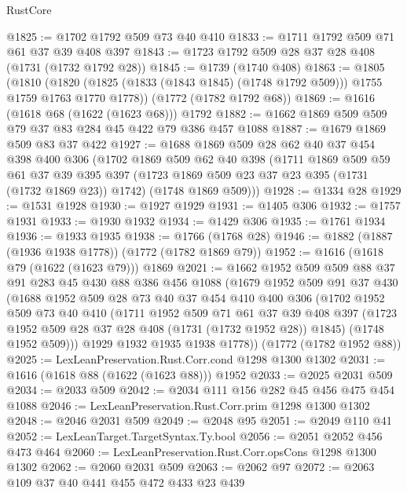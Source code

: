 \begin{lexlean}{RustCore}
\begin{coremodule}
@1825 := @1702 @1792 @509 @73 @40 @410
@1833 := @1711 @1792 @509 @71 @61 @37 @39 @408 @397
@1843 := @1723 @1792 @509 @28 @37 @28 @408 (@1731 (@1732 @1792 @28))
@1845 := @1739 (@1740 @408)
@1863 := @1805
    (@1810 (@1820 (@1825 (@1833 (@1843 @1845) (@1748 @1792 @509))) @1755 @1759 @1763 @1770 @1778))
    (@1772 (@1782 @1792 @68))
@1869 := @1616 (@1618 @68 (@1622 (@1623 @68))) @1792
@1882 := @1662 @1869 @509 @509 @79 @37 @83 @284 @45 @422 @79 @386 @457 @1088
@1887 := @1679 @1869 @509 @83 @37 @422
@1927 := @1688
    @1869
    @509
    @28
    @62
    @40
    @37
    @454
    @398
    @400
    @306
    (@1702
      @1869
      @509
      @62
      @40
      @398
      (@1711
        @1869
        @509
        @59
        @61
        @37
        @39
        @395
        @397
        (@1723 @1869 @509 @23 @37 @23 @395 (@1731 (@1732 @1869 @23)) @1742)
        (@1748 @1869 @509)))
@1928 := @1334 @28
@1929 := @1531 @1928
@1930 := @1927 @1929
@1931 := @1405 @306
@1932 := @1757 @1931
@1933 := @1930 @1932
@1934 := @1429 @306
@1935 := @1761 @1934
@1936 := @1933 @1935
@1938 := @1766 (@1768 @28)
@1946 := @1882 (@1887 (@1936 @1938 @1778)) (@1772 (@1782 @1869 @79))
@1952 := @1616 (@1618 @79 (@1622 (@1623 @79))) @1869
@2021 := @1662
    @1952
    @509
    @509
    @88
    @37
    @91
    @283
    @45
    @430
    @88
    @386
    @456
    @1088
    (@1679
      @1952
      @509
      @91
      @37
      @430
      (@1688
        @1952
        @509
        @28
        @73
        @40
        @37
        @454
        @410
        @400
        @306
        (@1702
          @1952
          @509
          @73
          @40
          @410
          (@1711
            @1952
            @509
            @71
            @61
            @37
            @39
            @408
            @397
            (@1723 @1952 @509 @28 @37 @28 @408 (@1731 (@1732 @1952 @28)) @1845)
            (@1748 @1952 @509)))
        @1929
        @1932
        @1935
        @1938
        @1778))
    (@1772 (@1782 @1952 @88))
@2025 := LexLeanPreservation.Rust.Corr.cond @1298 @1300 @1302
@2031 := @1616 (@1618 @88 (@1622 (@1623 @88))) @1952
@2033 := @2025 @2031 @509
@2034 := @2033 @509
@2042 := @2034 @111 @156 @282 @45 @456 @475 @454 @1088
@2046 := LexLeanPreservation.Rust.Corr.prim @1298 @1300 @1302
@2048 := @2046 @2031 @509
@2049 := @2048 @95
@2051 := @2049 @110 @41
@2052 := LexLeanTarget.TargetSyntax.Ty.bool
@2056 := @2051 @2052 @456 @473 @464
@2060 := LexLeanPreservation.Rust.Corr.opsCons @1298 @1300 @1302
@2062 := @2060 @2031 @509
@2063 := @2062 @97
@2072 := @2063 @109 @37 @40 @441 @455 @472 @433 @23 @439

\end{coremodule}
\end{lexlean}
